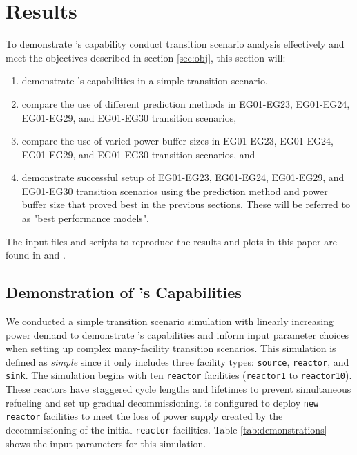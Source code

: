 \section{Results}
To demonstrate \deploy's capability conduct transition
scenario analysis effectively and meet the objectives described in section 
\ref{sec:obj}, this section will: 
\begin{enumerate}
\item demonstrate \deploy's capabilities in a simple transition scenario, 
\item compare the use of different \deploy prediction methods in EG01-EG23, EG01-EG24, 
EG01-EG29, and EG01-EG30 transition scenarios, 
\item compare the use of varied power buffer sizes in EG01-EG23, EG01-EG24, 
EG01-EG29, and EG01-EG30 transition scenarios, and
\item demonstrate successful \deploy setup of EG01-EG23, EG01-EG24, 
EG01-EG29, and EG01-EG30 transition scenarios using the prediction method and 
power buffer size that proved best in the previous sections. 
These will be referred to as "best performance models". 
\end{enumerate}
The input files and scripts to reproduce the results and plots in this
paper are found in \cite{chee_arfc/d3ploy:_2019} and 
\cite{bae_arfctransition-scenarios_2019}. 

\subsection{Demonstration of \deploy's Capabilities}
\label{sec:demo}
We conducted a simple transition scenario simulation with
linearly increasing power demand
to demonstrate \deploy's capabilities and inform input parameter 
choices when setting up complex many-facility transition scenarios. 
This simulation is defined as \textit{simple} since 
it only includes
three facility types: \texttt{source}, \texttt{reactor}, and 
\texttt{sink}. 
The simulation begins with ten \texttt{reactor} facilities 
(\texttt{reactor1} to \texttt{reactor10}). 
These reactors have staggered cycle lengths and lifetimes to prevent 
simultaneous refueling and set up gradual decommissioning. 
\deploy is configured to deploy \texttt{new reactor} facilities
to meet the loss of power supply created by the decommissioning 
of the initial \texttt{reactor} facilities. 
Table \ref{tab:demonstrations} shows the \deploy input parameters 
for this simulation.  

